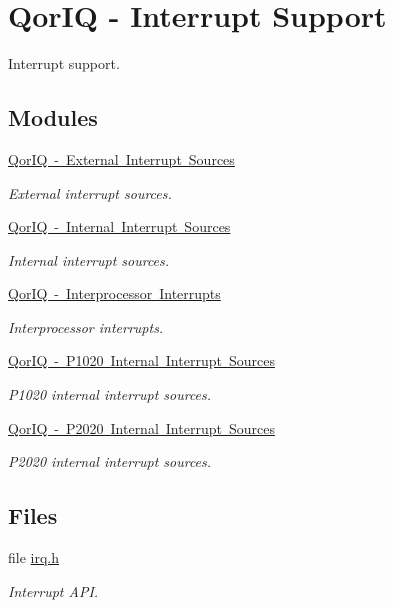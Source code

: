 \hypertarget{group__RTEMSBSPsPowerPCQorIQInterrupt}{}\section{Qor\+IQ -\/ Interrupt Support}
\label{group__RTEMSBSPsPowerPCQorIQInterrupt}


Interrupt support.  


\subsection*{Modules}
\begin{DoxyCompactItemize}
\item 
\mbox{\hyperlink{group__QoriqInterruptExternal}{Qor\+I\+Q -\/ External Interrupt Sources}}
\begin{DoxyCompactList}\small\item\em External interrupt sources. \end{DoxyCompactList}\item 
\mbox{\hyperlink{group__QoriqInterruptAll}{Qor\+I\+Q -\/ Internal Interrupt Sources}}
\begin{DoxyCompactList}\small\item\em Internal interrupt sources. \end{DoxyCompactList}\item 
\mbox{\hyperlink{group__QoriqInterruptIPI}{Qor\+I\+Q -\/ Interprocessor Interrupts}}
\begin{DoxyCompactList}\small\item\em Interprocessor interrupts. \end{DoxyCompactList}\item 
\mbox{\hyperlink{group__QoriqInterruptP1020}{Qor\+I\+Q -\/ P1020 Internal Interrupt Sources}}
\begin{DoxyCompactList}\small\item\em P1020 internal interrupt sources. \end{DoxyCompactList}\item 
\mbox{\hyperlink{group__QoriqInterruptP2020}{Qor\+I\+Q -\/ P2020 Internal Interrupt Sources}}
\begin{DoxyCompactList}\small\item\em P2020 internal interrupt sources. \end{DoxyCompactList}\end{DoxyCompactItemize}
\subsection*{Files}
\begin{DoxyCompactItemize}
\item 
file \mbox{\hyperlink{bsps_2powerpc_2qoriq_2include_2bsp_2irq_8h}{irq.\+h}}
\begin{DoxyCompactList}\small\item\em Interrupt A\+PI. \end{DoxyCompactList}\end{DoxyCompactItemize}
